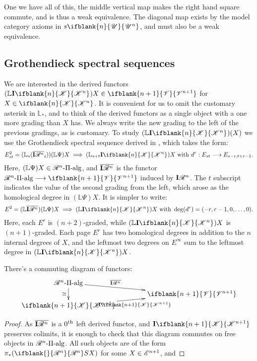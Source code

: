 \documentclass[10pt]{article}
\newcommand{\GS}[1]{\scrE^{#1}}
\newcommand{\PRLie}[1]{\scrR^{#1}}%
\newcommand{\LL}[1]{\ifblank{#1}{\scrK}{\scrK^{#1}}}
\newcommand{\GR}[1]{\ifblank{#1}{\scrV}{\scrV^{#1}}}
\newcommand{\nontop}[1]{\ifblank{#1}{\scrU}{\scrU^{#1}}}
\newcommand{\PiAlg}[1]{#1\textup{-$\Pi$-alg}}
\newcommand{\Ind}[2][]{\mathbf{I}{#2}_{#1}}%
\newcommand{\Fr}[2][]{\ifblank{#1}{#2}{#2_{#1}}}
\newcommand{\derived}{\mathbb{L}}
\begin{document}
\begin{GrothendieckSpectralSequences}
One we have all of this, the middle vertical map makes the right hand square commute, and is thus a weak equivalence. The diagonal map exists by the model category axioms in $s\nontop{n}$, and must also be a weak equivalence.




\subsection{Grothendieck spectral sequences}
We are interested in the derived functors $(\derived\Ind{\LL{n}})X\in\GR{n+1}$ for $X\in\LL{n}$. It is convenient for us to omit the customary asterisk in $\derived_*$, and to think of the derived functors as a single object with a one more grading than $X$ has. We always write the new grading to the left of the previous gradings, as is customary. To study $(\derived\Ind{\LL{n}})(X)$ we use the Grothendieck spectral sequence derived in \cite{Blanc_Stover-Groth_SS.pdf}, which takes the form:
\[E^2_{st}=(\derived_s(\overline{\Ind{\PRLie{n}}}_t))(\derived\Psi)X\implies(\derived_{s+t}\Ind{\LL{n}})X\textup{ with }d^{r}:E_{st}\to E_{s-r,t+r-1}.\]
Here, $(\derived\Psi)X\in\PiAlg{\PRLie{n}}$, and $\overline{\Ind{\PRLie{n}}}$ is the functor $\PiAlg{\PRLie{n}}\to\GR{n+1}$ induced by $\Ind{\PRLie{n}}$. The $t$ subscript indicates the value of the second grading from the left, which arose as the homological degree in $(\derived\Psi)X$. It is simpler to write:
\[E^2=(\derived\overline{\Ind{\PRLie{n}}})(\derived\Psi)X\implies(\derived\Ind{\LL{n}})X\textup{ with }\deg(d^r)=(-r,r-1,0,\ldots,0).\]
Here, each $E^r$ is $(n+2)$-graded, while $(\derived\Ind{\LL{n}})X$ is $(n+1)$-graded. Each page $E^r$ has two homological degrees in addition to the $n$ internal degrees of $X$, and the leftmost two degrees on $E^\infty$ sum to the leftmost degree in $(\derived\Ind{\LL{n}})X$.
\begin{prop}
There's a commuting diagram of functors:
\[\xymatrix@R=0mm@C=14mm{
\PiAlg{\PRLie{n}}
\ar[dr]^-{\overline{\Ind{\PRLie{n}}}}
\ar[dd]_-{\cong}
&%
\\%
&%
\GR{n+1}\\%
\LL{n+1}
\ar[ur]_-{\Ind{\LL{n+1}}}
&%
}\]
\end{prop}
\begin{proof}
As $\overline{\Ind{\PRLie{n}}}$ is a $0^\textup{th}$ left derived functor, and $\Ind{\LL{n+1}}$ preserves colimits, it is enough to check that this diagram commutes on free objects in $\PiAlg{\PRLie{n}}$. All such objects are of the form $\pi_*(\Fr{\PRLie{n}}SX)$ for some $X\in\GS{n+1}$, and

\end{proof}
\end{GrothendieckSpectralSequences}
\end{document}

